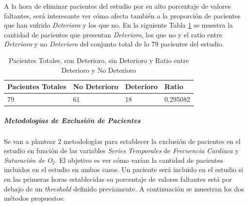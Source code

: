 A la hora de eliminar pacientes del estudio por su alto porcentaje de valores faltantes, será interesante ver cómo afecta también a la proporción de pacientes que han sufrido \textit{Deterioro} y los que no. En la siguiente Tabla \ref{tabla:ratio-deterioro} se muestra la cantidad de pacientes que presentan \textit{Deterioro}, los que no y el ratio entre \textit{Deterioro} y no \textit{Deterioro} del conjunto total de lo $79$ pacientes del estudio.

\begin{table}[H]
    \centering
    \begin{tabular}{|m{2cm}|m{2.25cm}|m{2cm}|m{2cm}|}
    \hline
        Pacientes Totales & No Deterioro & Deterioro & Ratio \\ \hline
        79 & 61 & 18 & 0.295082 \\ \hline
    \end{tabular}
    \caption{Pacientes Totales, con Deterioro, sin Deterioro y Ratio entre Deterioro y No Deterioro}
        \label{tabla:ratio-deterioro}
\end{table}

\newpage

\subparagraph{Metodologías de Exclusión de Pacientes}\label{sec:metodologias_exclusion_pacientes}

Se van a plantear $2$ metodologías para establecer la exclusión de pacientes en el estudio en función de las variables \textit{Series Temporales} de \textit{Frecuencia Cardiaca} y \textit{Saturación de O$_2$}. El objetivo es ver cómo varían la cantidad de pacientes incluidos en el estudio en ambos casos. Un paciente será incluido en el estudio si en las primeras horas establecidas su porcentaje de valores faltantes está por debajo de un \textit{threshold} definido previamente. A continuación se muestran los dos métodos propuestos: 

